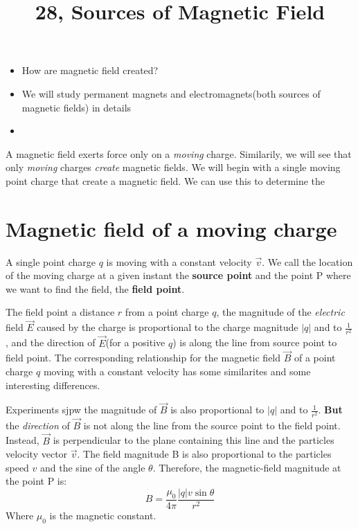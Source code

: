 \documentclass[11pt]{article}
\title{28, Sources of Magnetic Field}
\begin{document}
    \maketitle
    \begin{flushleft}
        \begin{itemize}
            \item How are magnetic field created? 
            \item We will study permanent magnets and electromagnets(both sources of magnetic fields) in details
            \item 
        \end{itemize}
        A magnetic field exerts force only on a \emph{moving} charge. 
        Similarily, we will see that only \emph{moving} charges \emph{create} magnetic fields. 
        We will begin with a single moving point charge that create a magnetic field. 
        We can use this to determine the 

        \section{Magnetic field of a moving charge}
        A single point charge $q$ is moving with a constant velocity $\vec{v}$. 
        We call the location of the moving charge at a given instant the \textbf{source point} and the point P where we want to find the field, the \textbf{field point}.
        \par \bigskip
        The field point a distance $r$ from a point charge $q$, 
        the magnitude of the \emph{electric} field $\vec{E}$ caused by the charge
        is proportional to the charge magnitude $|q|$ and to $\frac{1}{r^2}$,
        and the direction of $\vec{E}$(for a positive $q$) is along the line from source point to field point.
        The corresponding relationship for the magnetic field $\vec{B}$ of a point charge $q$ moving with a constant velocity has some similarites and some interesting differences.
        \par\bigskip
        Experiments sjpw the magnitude of $\vec{B}$ is also proportional to $|q|$ and to $\frac{1}{r^2}$. 
        \textbf{But} the \emph{direction} of $\vec{B}$ is not along the line from the source point to the field point.
        Instead, $\vec{B}$ is perpendicular to the plane containing this line and the particles velocity vector $\vec{v}$.
        The field magnitude B is also proportional to the particles speed $v$ and the sine of the angle $\theta$. 
        Therefore, the magnetic-field magnitude at the point P is:
        \[B=\frac{\mu_0}{4\pi}\frac{|q|v\sin\theta}{r^2}\]
        Where $\mu_0$ is the magnetic constant. 


\end{flushleft}
\end{document}
